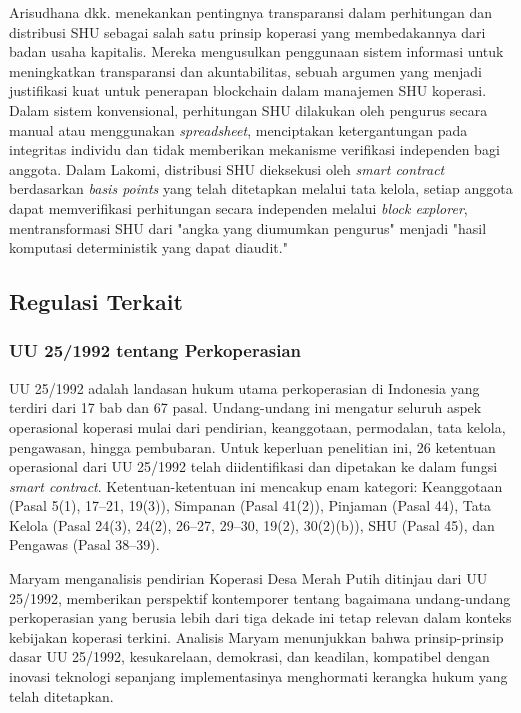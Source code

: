 Arisudhana dkk. \cite{arisudhana2025pelatihan} menekankan pentingnya transparansi dalam perhitungan dan distribusi SHU sebagai salah satu prinsip koperasi yang membedakannya dari badan usaha kapitalis. Mereka mengusulkan penggunaan sistem informasi untuk meningkatkan transparansi dan akuntabilitas, sebuah argumen yang menjadi justifikasi kuat untuk penerapan blockchain dalam manajemen SHU koperasi. Dalam sistem konvensional, perhitungan SHU dilakukan oleh pengurus secara manual atau menggunakan \textit{spreadsheet}, menciptakan ketergantungan pada integritas individu dan tidak memberikan mekanisme verifikasi independen bagi anggota. Dalam Lakomi, distribusi SHU dieksekusi oleh \textit{smart contract} berdasarkan \textit{basis points} yang telah ditetapkan melalui tata kelola, setiap anggota dapat memverifikasi perhitungan secara independen melalui \textit{block explorer}, mentransformasi SHU dari "angka yang diumumkan pengurus" menjadi "hasil komputasi deterministik yang dapat diaudit."

\subsection{Regulasi Terkait}

\subsubsection{UU 25/1992 tentang Perkoperasian}

UU 25/1992 \cite{uu251992} adalah landasan hukum utama perkoperasian di Indonesia yang terdiri dari 17 bab dan 67 pasal. Undang-undang ini mengatur seluruh aspek operasional koperasi mulai dari pendirian, keanggotaan, permodalan, tata kelola, pengawasan, hingga pembubaran. Untuk keperluan penelitian ini, 26 ketentuan operasional dari UU 25/1992 telah diidentifikasi dan dipetakan ke dalam fungsi \textit{smart contract}. Ketentuan-ketentuan ini mencakup enam kategori: Keanggotaan (Pasal 5(1), 17--21, 19(3)), Simpanan (Pasal 41(2)), Pinjaman (Pasal 44), Tata Kelola (Pasal 24(3), 24(2), 26--27, 29--30, 19(2), 30(2)(b)), SHU (Pasal 45), dan Pengawas (Pasal 38--39).

Maryam \cite{maryam2025pendirian} menganalisis pendirian Koperasi Desa Merah Putih ditinjau dari UU 25/1992, memberikan perspektif kontemporer tentang bagaimana undang-undang perkoperasian yang berusia lebih dari tiga dekade ini tetap relevan dalam konteks kebijakan koperasi terkini. Analisis Maryam menunjukkan bahwa prinsip-prinsip dasar UU 25/1992, kesukarelaan, demokrasi, dan keadilan, kompatibel dengan inovasi teknologi sepanjang implementasinya menghormati kerangka hukum yang telah ditetapkan.

